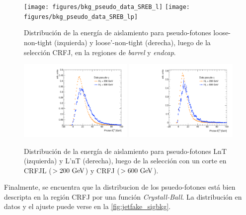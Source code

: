 \begin{figure}[!htbp]
  \centering

  \texttt{[image: figures/bkg\_pseudo\_data\_SREB\_l]}
  \texttt{[image: figures/bkg\_pseudo\_data\_SREB\_lp]}

  \caption{Distribución de la energía de aislamiento para pseudo-fotones loose-non-tight (izquierda) y loose'-non-tight (derecha),
    luego de la selección CRFJ, en la regiones de \emph{barrel} y \emph{endcap}.}
  \label{fig:jetfake_pseudo_data_BE}

\end{figure}

\begin{figure}[!htbp]
  \centering

  \includegraphics[width=0.49\textwidth]{figures/bkg_pseudo_data_SR_VR_l}
  \includegraphics[width=0.49\textwidth]{figures/bkg_pseudo_data_SR_VR_lp}

  \caption{Distribución de la energía de aislamiento para pseudo-fotones LnT (izquierda) y L'nT (derecha),
    luego de la selección con un corte en {\HT} CRFJL ($>200 \gev$) y CRFJ ($>600 \gev$).}
  \label{fig:jetfake_pseudo_data_LR_VR}

\end{figure}

Finalmente, se encuentra que la distribucion de los psuedo-fotones está bien descripta en la región CRFJ por una función
\emph{Crystall-Ball}. La distribución en datos y el ajuste puede verse en la \cref{fig:jetfake_sigbkg}.

